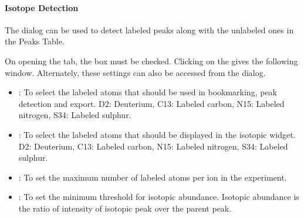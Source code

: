 \documentclass[letterpaper,10pt,english,openany,oneside]{sphinxmanual}
\begin{document}
\paragraph{Isotope Detection}
\label{\detokenize{LabeledLCMSWorkflow:isotope-detection}}

The  dialog  can be used to detect labeled peaks along with the unlabeled ones in the Peaks Table.


On opening the  tab, the  box must be checked. Clicking on the  gives the following window. Alternately, these settings can also be accessed from the  dialog.

\begin{itemize}
\item {} 
: To select the labeled atoms that should be used in bookmarking, peak detection and export. D2: Deuterium, C13: Labeled carbon, N15: Labeled nitrogen, S34: Labeled sulphur.

\item {} 
: To select the labeled atoms that should be displayed in the isotopic widget. D2: Deuterium, C13: Labeled carbon, N15: Labeled nitrogen, S34: Labeled sulphur.

\item {} 
: To set the maximum number of labeled atoms per ion in the experiment.

\item {} 
: To set the minimum threshold for isotopic abundance. Isotopic abundance is the ratio of intensity of isotopic peak over the parent peak.

\end{itemize}
\end{document}
